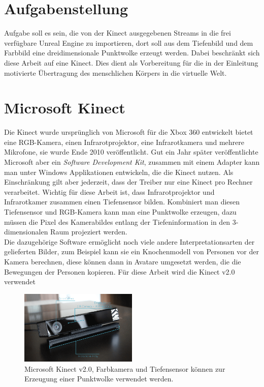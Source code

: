 \documentclass[a4paper]{IEEEtran}
\begin{document}
\section{Aufgabenstellung}
	Aufgabe soll es sein, die von der Kinect ausgegebenen Streams in die frei verfügbare Unreal Engine zu importieren, dort soll aus dem Tiefenbild und dem Farbbild eine dreidimensionale Punktwolke erzeugt werden. 
	Dabei beschränkt sich diese Arbeit auf eine Kinect. 
	Dies dient als Vorbereitung für die in der Einleitung motivierte Übertragung des menschlichen Körpers in die virtuelle Welt. \\


\section{Microsoft Kinect}
	Die Kinect wurde ursprünglich von Microsoft für die Xbox 360 entwickelt bietet eine RGB-Kamera, einen Infrarotprojektor, eine Infrarotkamera und mehrere Mikrofone, sie wurde Ende 2010 veröffentlicht. 
	Gut ein Jahr später veröffentlichte Microsoft aber ein \textit{Software Development Kit}, zusammen mit einem Adapter kann man unter Windows Applikationen entwickeln, die die Kinect nutzen.
	Als Einschränkung gilt aber jederzeit, dass der Treiber nur eine Kinect pro Rechner verarbeitet.
	Wichtig für diese Arbeit ist, dass Infrarotprojektor und Infrarotkamer zusammen einen Tiefensensor bilden. 
	Kombiniert man diesen Tiefensensor und RGB-Kamera kann man eine Punktwolke erzeugen, dazu müssen die Pixel des Kamerabildes entlang der Tiefeninformation in den 3-dimensionalen Raum projeziert werden. \\
	Die dazugehörige Software ermöglicht noch viele andere Interpretationsarten der gelieferten Bilder, zum Beispiel kann sie ein Knochenmodell von Personen vor der Kamera berechnen, diese können dann in Avatare umgesetzt werden, die die Bewegungen der Personen kopieren.
	Für diese Arbeit wird die Kinect v2.0 verwendet \\[0.5cm]
	
	\begin{figure}[!h]
    	\centering
		\includegraphics[width=0.5\textwidth]{img/Kinectv2}
	    \caption{Microsoft Kinect v2.0, Farbkamera und Tiefensensor können zur Erzeugung einer Punktwolke verwendet werden.}
    	\label{Kinectv2}
	\end{figure}
	
\end{document}
